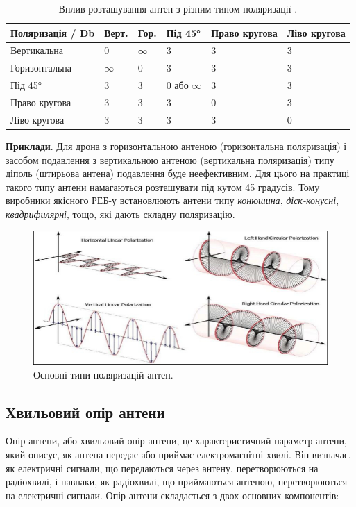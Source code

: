 \documentclass{article}
\begin{document}
\begin{table}[ht]
\centering
\begin{tabular}{|l|l|l|l|l|l|}
\hline
\textbf{Поляризація / Db} & \textbf{Верт.} & \textbf{Гор.} & \textbf{Під 45°} & \textbf{Право кругова} & \textbf{Ліво кругова} \\
\hline
Вертикальна      & 0           & $\infty$     & 3            & 3            & 3            \\
Горизонтальна    & $\infty$    & 0            & 3            & 3            & 3            \\
Під 45°          & 3           & 3            & 0 або $\infty$ & 3            & 3          \\
Право кругова    & 3           & 3            & 3            & 0            & 3            \\
Ліво кругова     & 3           & 3            & 3            & 3            & 0            \\
\hline
\end{tabular}
\caption{\label{table:polarization}Вплив розташування антен з різним типом поляризації \cite{book:rothammel}.}
\end{table}


\textbf{Приклади}. Для дрона з горизонтальною антеною (горизонтальна поляризація) і засобом подавлення з вертикальною антеною (вертикальна поляризація) типу діполь (штирьова антена) подавлення буде неефективним. Для цього на практиці такого типу антени намагаються розташувати під кутом 45 градусів. Тому виробники якісного РЕБ-у встановлюють антени типу \textit{конюшина}, \textit{діск-конусні}, \textit{квадрифилярні}, тощо, які дають складну поляризацію.

\begin{figure}[H]
\centering
\includegraphics[width=0.7\linewidth]{images/polarization.jpeg}
\caption{\label{fig:polarization}Основні типи поляризацій антен.}
\end{figure}

\subsection{Хвильовий опір антени}
Опір антени, або хвильовий опір антени, це характеристичний параметр антени, який описує, як антена передає або приймає електромагнітні хвилі. Він визначає, як електричні сигнали, що передаються через антену, перетворюються на радіохвилі, і навпаки, як радіохвилі, що приймаються антеною, перетворюються на електричні сигнали. Опір антени складається з двох основних компонентів:
\end{document}
